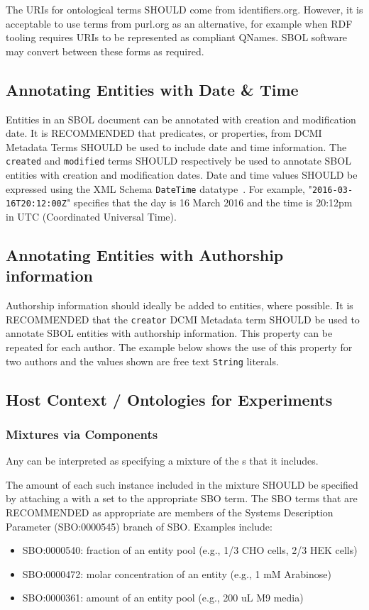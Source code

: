 The URIs for ontological terms SHOULD come from identifiers.org.  However, it is acceptable to use terms from purl.org as an alternative, for example when RDF tooling requires URIs to be represented as compliant QNames.  SBOL software may convert between these forms as required.

\subsection{Annotating Entities with Date \& Time}\label{sec:DateTime}
Entities in an SBOL document can be annotated with creation and modification date. It is RECOMMENDED that predicates, or properties, from DCMI Metadata Terms SHOULD be used to include date and time information. The \texttt{created} and \texttt{modified} terms SHOULD respectively be used to annotate SBOL entities with creation and modification dates. Date and time values SHOULD be expressed using the XML Schema \texttt{DateTime} datatype~\citep{Biron2004}. For example, "\texttt{2016-03-16T20:12:00Z}" specifies that the day is 16 March 2016 and the time is 20:12pm in UTC (Coordinated Universal Time).

\subsection{Annotating Entities with Authorship information}\label{sec:Authorship}
Authorship information should ideally be added to  entities, where possible. It is RECOMMENDED that the \texttt{creator} DCMI Metadata term SHOULD be used to annotate SBOL entities with authorship information. This property can be repeated for each author. The example below shows the use of this property for two authors and the values shown are free text \texttt{String} literals.

\subsection{Host Context / Ontologies for Experiments}

\subsubsection{Mixtures via Components}

Any  can be interpreted as specifying a mixture of the s that it includes.

The amount of each such instance included in the mixture SHOULD be specified by attaching a  with a  set to the appropriate SBO term. The SBO terms that are RECOMMENDED as appropriate are members of the Systems Description Parameter (SBO:0000545) branch of SBO. Examples include:
\begin{itemize}
\item SBO:0000540: fraction of an entity pool (e.g., 1/3 CHO cells, 2/3 HEK cells)
\item SBO:0000472: molar concentration of an entity (e.g., 1 mM Arabinose)
\item SBO:0000361: amount of an entity pool (e.g., 200 uL M9 media)
\end{itemize}

